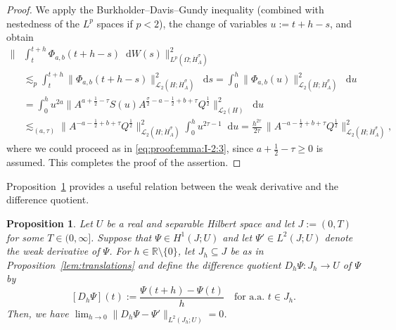 \documentclass[reqno]{amsart}
\numberwithin{equation}{section}
\newcommand{\R}{\mathbb{R}}
\newcommand{\norm}[2]{     \| #1       \|_{ #2 }}
\newcommand{\rd}{\mathop{}\!\mathrm{d}}
\newcommand{\from}{\colon}
\newcommand{\Hdot}[1]{\dot{H}^{#1}_A}
\newtheorem{proposition}[lemma]{Proposition}
\theoremstyle{remark}
\theoremstyle{definition}
\begin{document}
\begin{proof} 
	We apply the Burkholder--Davis--Gundy inequality 
	(combined with nestedness of the 
	$L^p$ spaces if $p<2$), 
	the change of variables $u := t+h-s$,  
	and obtain  
	\begin{align*}
	\biggl\| 
	&\int_t^{t+h} \Phi_{a,b}(t+h-s) \rd W(s) 
	\biggr\|_{L^p(\Omega;\dot H_A^\sigma)}^2 
	\\
	&\lesssim_p 
	\int_t^{t+h} 
	\norm{\Phi_{a,b}(t+h-s)}{\mathscr L_2(H;\Hdot{\sigma})}^2 
	\rd s 
	= 
	\int_0^h \norm{\Phi_{a,b}(u)}{\mathscr L_2(H;\Hdot{\sigma})}^2 
	\rd u 
	\\
	&= 
	\int_0^h 
	u^{ 2a }
	\bigl\| A^{a+\frac{1}{2}-\tau} S(u) A^{\frac{\sigma}{2} -a -\frac{1}{2} + b +\tau }
	Q^{\frac{1}{2}} \bigr\|_{ \mathscr L_2(H)}^2 
	\rd u 
	\\
	&\lesssim_{(a,\tau)} 
	\bigl\| A^{ -a -\frac{1}{2} + b +\tau }Q^{\frac{1}{2}} \bigr\|_{ 
		\mathscr L_2(H; \dot H_A^\sigma)}^2 
	\int_0^h 
	u^{ 2\tau - 1}
	\rd u 
	=
	\frac{h^{ 2\tau }}{2\tau} \, 
	\bigl\| A^{-a -\frac{1}{2} + b +\tau }Q^{\frac{1}{2}} \bigr\|_{ 
		\mathscr L_2(H; \dot H_A^\sigma)}^2 ,
	\end{align*} 
	where we could proceed as in \eqref{eq:proof:emma:I-2:3}, 
	since $a+\frac{1}{2}-\tau \geq 0$ is assumed. 
	This completes the proof of the assertion. 
\end{proof}

Proposition~\ref{prop:Dh-converges-in-Lp} provides 
a useful relation between the weak derivative and the difference quotient.
%
\begin{proposition}\label{prop:Dh-converges-in-Lp} 
	Let $U$ be a real and separable Hilbert space
	and 
	let $J:=(0,T)$ 
	for some $T \in (0,\infty]$. 
	Suppose that $\Psi \in H^1(J; U)$ 
	and let $\Psi'\in L^2(J;U)$ denote the 
	weak derivative of $\Psi$.  
	For $h\in \R\setminus\{0\}$, let $J_h\subseteq J$ be as in
	Proposition~\textup{\ref{lem:translations}} and
	define the \emph{difference quotient} 
	$D_h \Psi \from J_h \to U$ 
	of $\Psi$ by 
	\begin{equation}\label{eq:def:Dh} 
	[D_h \Psi](t) 
	:= 
	\frac{ \Psi(t+h) - \Psi(t) }{h} 
	\quad 
	\text{for a.a.~$t \in J_h$}.
	\end{equation} 
	Then, we have 
	$\lim_{h\to 0} 
	\norm{D_h \Psi - \Psi'}{L^2(J_h;U)} 
	=0$. 
\end{proposition}
\end{document}
